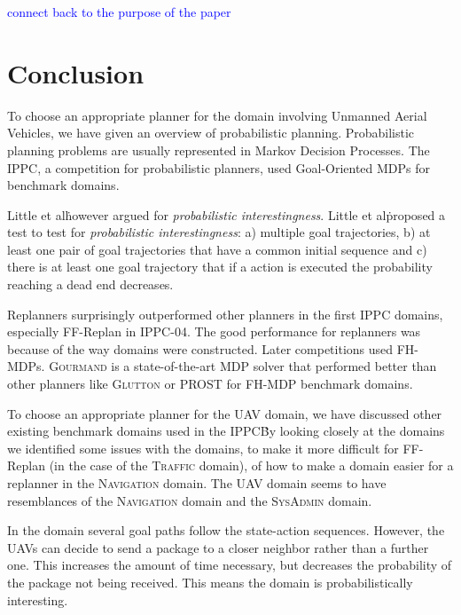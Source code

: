 \documentclass[runningheads,a4paper]{llncs}
\newcommand\todo[1]{\textcolor{blue}{#1}}
\begin{document}
\todo{connect back to the purpose of the paper}


\section{Conclusion}
\label{sec:conclusion}

To choose an appropriate planner for the domain involving Unmanned Aerial
Vehicles, we have given an overview of probabilistic planning. Probabilistic
planning problems are usually represented in Markov Decision Processes. The
IPPC, a competition for probabilistic planners, used Goal-Oriented MDPs for
benchmark domains.

Little et al\. however argued for \emph{probabilistic
interestingness}. Little et al\. proposed a test to test for \emph{probabilistic
interestingness}: a) multiple goal trajectories, b) at least one pair of goal
trajectories that have a common initial sequence and c) there is at least one
goal trajectory that if a action is executed the probability reaching a dead
end decreases.

Replanners surprisingly outperformed other planners in the first IPPC domains,
especially FF-Replan in IPPC-04. The good performance for replanners was
because of the way domains were constructed. Later competitions used FH-MDPs.
\textsc{Gourmand} is a state-of-the-art MDP solver that performed better than
other planners like \textsc{Glutton} or PROST for FH-MDP benchmark domains.

To choose an appropriate planner for the UAV domain, we have discussed other
existing benchmark domains used in the IPPC\. By looking closely at the domains
we identified some issues with the domains, to make it more difficult for
FF-Replan (in the case of the \textsc{Traffic} domain), of how to make a domain
easier for a replanner in the \textsc{Navigation} domain. The UAV domain seems
to have resemblances of the \textsc{Navigation} domain and the
\textsc{SysAdmin} domain.

In the domain several goal paths follow the state-action sequences. However,
the UAVs can decide to send a package to a closer neighbor rather than a
further one. This increases the amount of time necessary, but decreases the
probability of the package not being received. This means the domain is
probabilistically interesting.
\end{document}
